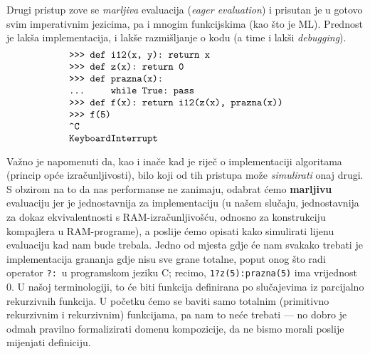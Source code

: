 Drugi pristup zove se \emph{marljiva} evaluacija (\emph{eager evaluation}) i prisutan je u gotovo svim imperativnim jezicima, pa i mnogim funkcijskima (kao što je ML). Prednost je lakša implementacija, i lakše razmišljanje o kodu (a time i lakši \emph{debugging}).
\begin{equation}\begin{minipage}{0.8\textwidth}
\begin{verbatim}
    >>> def i12(x, y): return x
    >>> def z(x): return 0
    >>> def prazna(x):
    ...     while True: pass
    >>> def f(x): return i12(z(x), prazna(x))
    >>> f(5)
    ^C
    KeyboardInterrupt
\end{verbatim}
\end{minipage}\end{equation}

Važno je napomenuti da, kao i inače kad je riječ o implementaciji algoritama (princip opće izračunljivosti), bilo koji od tih pristupa može \emph{simulirati} onaj drugi. S obzirom na to da nas performanse ne zanimaju, odabrat ćemo \textbf{marljivu} evaluaciju jer je jednostavnija za implementaciju (u našem slučaju, jednostavnija za dokaz ekvivalentnosti s RAM-izračunljivošću, odnosno za konstrukciju kompajlera u RAM-programe), a poslije ćemo opisati kako simulirati lijenu evaluaciju kad nam bude trebala. Jedno od mjesta gdje će nam svakako trebati je implementacija grananja gdje nisu sve grane totalne, poput onog što radi operator \texttt{?:}\ u programskom jeziku C; recimo, \texttt{1?z(5):prazna(5)} ima vrijednost $0$. U našoj terminologiji, to će biti funkcija definirana po slučajevima iz parcijalno rekurzivnih funkcija. U početku ćemo se baviti samo totalnim (primitivno rekurzivnim i rekurzivnim) funkcijama, pa nam to neće trebati --- no dobro je odmah pravilno formalizirati domenu kompozicije, da ne bismo morali poslije mijenjati definiciju.

